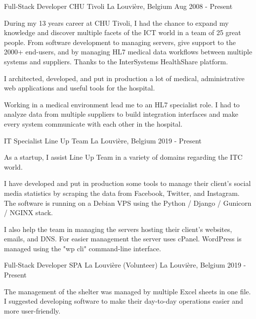 

\begin{cventries}

  \cventry
    {Full-Stack Developer} %
    {CHU Tivoli} %
    {La Louvière, Belgium} %
    {Aug 2008 - Present} %
    {
During my 13 years career at CHU Tivoli, I had the chance to expand my knowledge and discover multiple facets of the ICT world in a team of 25  great people. From software development to managing servers, give support to the 2000+ end-users, and by managing HL7 medical data workflows between multiple systems and suppliers. Thanks to the InterSystems HealthShare platform.
    
I architected, developed, and put in production a lot of medical, administrative web applications and useful tools for the hospital.

Working in a medical environment lead me to an HL7 specialist role. I had to analyze data from multiple suppliers to build integration interfaces and make every system communicate with each other in the hospital.

    }

  \cventry
    {IT Specialist} %
    {Line Up Team} %
    {La Louvière, Belgium} %
    {2019 - Present} %
    {
As a startup, I assist Line Up Team in a variety of domains regarding the ITC world.

I have developed and put in production some tools to manage their client's social media statistics by scraping the data from Facebook, Twitter, and Instagram. The software is running on a Debian VPS using the Python / Django / Gunicorn / NGINX stack.

I also help the team in managing the servers hosting their client's websites, emails, and DNS. For easier management the server uses cPanel. WordPress is managed using the "wp cli" command-line interface.

    }
    
    
  \cventry
    {Full-Stack Developer} %
    {SPA La Louvière (Volunteer)} %
    {La Louvière, Belgium} %
    {2019 - Present} %
    {
The management of the shelter was managed by multiple Excel sheets in one file.
I suggested developing software to make their day-to-day operations easier and more user-friendly.

}
\end{cventries}
